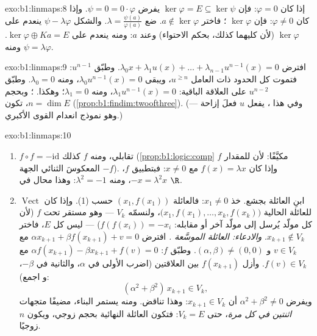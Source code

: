\begin{solution}{exo:b1:linmaps:8}
إذا كان $\varphi = 0$: فإن $\ker\varphi = E \subseteq \ker\psi$ يفرض
$\psi = 0 = 0\cdot\varphi$. وإذا كان $\varphi \neq 0$: فإن $\ker\varphi$
؛ فاختر $a \notin \ker\varphi$. ضع $\lambda =
\frac{\psi(a)}{\varphi(a)}$. والشكل $\psi - \lambda\varphi$
ينعدم على $\ker\varphi$ (لأن كليهما كذلك، بحكم الاحتواء) وعند $a$:
ومنه ينعدم على $\ker\varphi \oplus Ka = E$. ومنه $\psi =
\lambda\varphi$.
\end{solution}

\begin{solution}{exo:b1:linmaps:9}
افترض $\lambda_0 x + \lambda_1 u(x) + \dots + \lambda_{n-1}
u^{n-1}(x) = 0$. وطبّق $u^{n-1}$: فتموت كل الحدود ذات العامل $u^{\geq
n}$، ويبقى $\lambda_0 u^{n-1}(x) = 0$، ومنه $\lambda_0 = 0$.
وطبّق $u^{n-2}$ على العلاقة الباقية: $\lambda_1 u^{n-1}(x) =
0$، ومنه $\lambda_1 = 0$؛ وهكذا. ؛ وبحجم
$n = \dim E$، تكون  (\cref{prop:b1:findim:twoofthree}). (وفي
هذا ، يفعل $u$ فعلَ إزاحة --- وهو نموذج انعدام
القوى الأكبري.)
\end{solution}

\begin{solution}{exo:b1:linmaps:10}
\begin{enumerate}
  \item $f \circ f = -\mathrm{id}$ تقابلي، ومنه  $f$ كذلك
        (\cref{prop:b1:logic:comp} مكيَّفًا: لأن للمقدار $f$ المعكوسَ
        الثنائي الجهة $-f$). وإذا كان $f(x) = \lambda x$ مع $x \neq 0$:
        فبتطبيق $f$، $-x = \lambda^2 x$، ومنه $\lambda^2 = -1$:
        وهذا محال في $\R$.
  \item ابنِ العائلة بجشع. خذ $x_1 \neq 0$: فالعائلة $(x_1,
        f(x_1))$  حسب (1). وإذا كان $\operatorname{Vect}$ للعائلة
        الحالية $\bigl(x_1, f(x_1), \dots, x_k,
        f(x_k)\bigr)$، ولنسمّه $V_k$ --- وهو  مستقر تحت $f$
        (لأن كل مولّد يُرسل إلى مولّد آخر أو مقابله:
        $f(f(x_i)) = -x_i$) --- ليس كل $E$، فاختر $x_{k+1}
        \notin V_k$. \emph{والادعاء: العائلة الموسَّعة .}
        افترض $\alpha x_{k+1} + \beta f(x_{k+1}) + v = 0$ مع $v
        \in V_k$ و $(\alpha, \beta) \neq (0,0)$. وطبّق $f$:
        $\alpha f(x_{k+1}) - \beta x_{k+1} + f(v) = 0$ مع $f(v)
        \in V_k$. وأزل $f(x_{k+1})$ بين العلاقتين
        (اضرب الأولى في $\alpha$، والثانية في $-\beta$، و
        اجمع):
        \[
        (\alpha^2 + \beta^2)\, x_{k+1} \in V_k ,
        \]
        ويفرض $\alpha^2 + \beta^2 \neq 0$ أن $x_{k+1} \in V_k$:
        وهذا تناقض. ومنه يستمر البناء، مضيفًا متجهات
        \emph{اثنتين في كل مرة}، حتى $V_k = E$: فتكون العائلة النهائية
         بحجم زوجي، ويكون $n$ زوجيًا.
\end{enumerate}
\end{solution}

